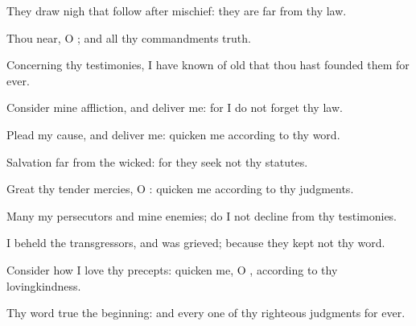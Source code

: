 {\Q {}They draw
nigh that
follow after
mischief: they are
far from thy
law.


\par }{\Q {}Thou
{}
near, O
{}; and all thy
commandments
{}
truth.


\par }{\Q {}Concerning thy
testimonies, I have
known of
old that thou hast
founded them for
ever.


\par }{\BB \par }
{
\par }
{\Q {}Consider mine
affliction, and
deliver me: for I do not
forget thy
law.


\par }{\Q {}Plead my
cause, and
deliver me:
quicken me according to thy
word.


\par }{\Q {}Salvation
{}
far from the
wicked: for they
seek not thy
statutes.


\par }{\Q {}Great
{} thy tender
mercies, O
{}:
quicken me according to thy
judgments.


\par }{\Q {}Many
{} my
persecutors and mine
enemies;
{} do I not
decline from thy
testimonies.


\par }{\Q {}I
beheld the
transgressors, and was
grieved; because they
kept not thy
word.


\par }{\Q {}Consider how I
love thy
precepts:
quicken me, O
{}, according to thy
lovingkindness.


\par }{\Q {}Thy
word
{}
true
{} the
beginning: and every one of thy
righteous
judgments
{} for
ever.


\par }{
\par }

